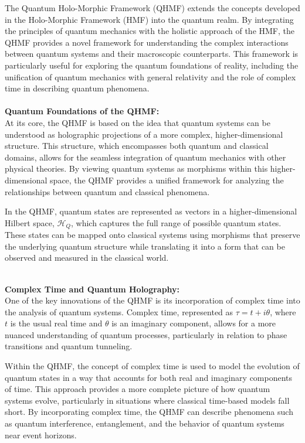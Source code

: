 \documentclass{article}
\begin{document}
The Quantum Holo-Morphic Framework (QHMF) extends the concepts developed in the Holo-Morphic Framework (HMF) into the quantum realm. By integrating the principles of quantum mechanics with the holistic approach of the HMF, the QHMF provides a novel framework for understanding the complex interactions between quantum systems and their macroscopic counterparts. This framework is particularly useful for exploring the quantum foundations of reality, including the unification of quantum mechanics with general relativity and the role of complex time in describing quantum phenomena.
\\
\\

\textbf{Quantum Foundations of the QHMF:}
\\

At its core, the QHMF is based on the idea that quantum systems can be understood as holographic projections of a more complex, higher-dimensional structure. This structure, which encompasses both quantum and classical domains, allows for the seamless integration of quantum mechanics with other physical theories. By viewing quantum systems as morphisms within this higher-dimensional space, the QHMF provides a unified framework for analyzing the relationships between quantum and classical phenomena.

In the QHMF, quantum states are represented as vectors in a higher-dimensional Hilbert space, \( \mathcal{H}_Q \), which captures the full range of possible quantum states. These states can be mapped onto classical systems using morphisms that preserve the underlying quantum structure while translating it into a form that can be observed and measured in the classical world.
\\

\

\textbf{Complex Time and Quantum Holography:}
\\

One of the key innovations of the QHMF is its incorporation of complex time into the analysis of quantum systems. Complex time, represented as \( \tau = t + i\theta \), where \( t \) is the usual real time and \( \theta \) is an imaginary component, allows for a more nuanced understanding of quantum processes, particularly in relation to phase transitions and quantum tunneling.

Within the QHMF, the concept of complex time is used to model the evolution of quantum states in a way that accounts for both real and imaginary components of time. This approach provides a more complete picture of how quantum systems evolve, particularly in situations where classical time-based models fall short. By incorporating complex time, the QHMF can describe phenomena such as quantum interference, entanglement, and the behavior of quantum systems near event horizons.
\\
\\
\end{document}
